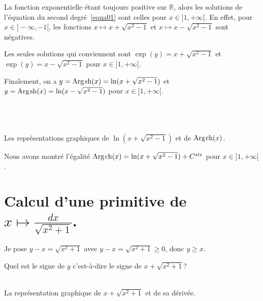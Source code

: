 \documentclass[a4paper,landscape,17pt]{extreport} %
\def\eclaire{\mathbb}
\def\R{\ensuremath{\eclaire R}}
\renewcommand{\sinh}{\mathop{\mathrm{sh}}}
\renewcommand{\cosh}{\mathop{\mathrm{ch}}}
\renewcommand{\arg}{\mathop{\mathrm{Arg}}}
\begin{document}
La fonction exponentielle étant toujours positive sur $\R$, alors  les solutions de l'équation du second degré~\ref{equa01} sont celles pour  $ x \in ]1,+\infty[ $. En effet, pour $ x \in ]-\infty,-1[ $, les fonctions $x \mapsto x + \sqrt{x^2-1}$ et $x \mapsto x - \sqrt{x^2-1}$ sont négatives.

Les seules solutions qui conviennent sont  $\exp(y)  = x + \sqrt{x^2-1}$ et $\exp(y) = x - \sqrt{x^2-1}$ pour $ x \in ]1,+\infty[ $.


Finalement, on a  $y = \arg\mspace{-1mu}\sinh\nolimits(x) = \ln(x + \sqrt{x^2-1})$ et $y = \arg\mspace{-1mu}\sinh\nolimits(x) = \ln(x - \sqrt{x^2-1})$ pour $ x \in ]1,+\infty[ $.



\begin{center}
\\
 \\
\\
Les représentations graphiques de $\ln(x + \sqrt{x^2-1})$ et de $\arg\mspace{-1mu}\cosh\nolimits(x)$.
\end{center}


Nous avons montré l'égalité $\arg\mspace{-1mu}\cosh\nolimits(x) = \ln(x + \sqrt{x^2-1}) + C^{ste} $ pour $ x \in ]1,+\infty[ $.


\section{Calcul d'une primitive de $ x \longmapsto  \frac{dx}{\sqrt{x^2 + 1} } $. }


Je pose $y-x = \sqrt{x^2+1} $ avec $y - x = \sqrt{x^2 + 1} \geqslant 0 $, donc $y \geqslant  x$.

Quel est le signe de $y$ c'est-à-dire le signe de $x + \sqrt{x^2+1} $?

\begin{center}
 \\
La représentation graphique de $x + \sqrt{x^2+1}$ et de sa dérivée.
\end{center}
\end{document}
